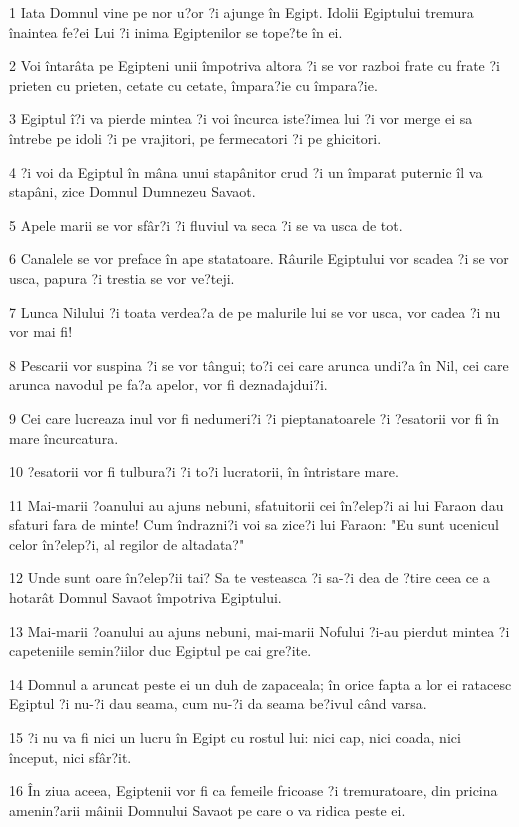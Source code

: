 \par 1 Iata Domnul vine pe nor u?or ?i ajunge în Egipt. Idolii Egiptului tremura înaintea fe?ei Lui ?i inima Egiptenilor se tope?te în ei.
\par 2 Voi întarâta pe Egipteni unii împotriva altora ?i se vor razboi frate cu frate ?i prieten cu prieten, cetate cu cetate, împara?ie cu împara?ie.
\par 3 Egiptul î?i va pierde mintea ?i voi încurca iste?imea lui ?i vor merge ei sa întrebe pe idoli ?i pe vrajitori, pe fermecatori ?i pe ghicitori.
\par 4 ?i voi da Egiptul în mâna unui stapânitor crud ?i un împarat puternic îl va stapâni, zice Domnul Dumnezeu Savaot.
\par 5 Apele marii se vor sfâr?i ?i fluviul va seca ?i se va usca de tot.
\par 6 Canalele se vor preface în ape statatoare. Râurile Egiptului vor scadea ?i se vor usca, papura ?i trestia se vor ve?teji.
\par 7 Lunca Nilului ?i toata verdea?a de pe malurile lui se vor usca, vor cadea ?i nu vor mai fi!
\par 8 Pescarii vor suspina ?i se vor tângui; to?i cei care arunca undi?a în Nil, cei care arunca navodul pe fa?a apelor, vor fi deznadajdui?i.
\par 9 Cei care lucreaza inul vor fi nedumeri?i ?i pieptanatoarele ?i ?esatorii vor fi în mare încurcatura.
\par 10 ?esatorii vor fi tulbura?i ?i to?i lucratorii, în întristare mare.
\par 11 Mai-marii ?oanului au ajuns nebuni, sfatuitorii cei în?elep?i ai lui Faraon dau sfaturi fara de minte! Cum îndrazni?i voi sa zice?i lui Faraon: "Eu sunt ucenicul celor în?elep?i, al regilor de altadata?"
\par 12 Unde sunt oare în?elep?ii tai? Sa te vesteasca ?i sa-?i dea de ?tire ceea ce a hotarât Domnul Savaot împotriva Egiptului.
\par 13 Mai-marii ?oanului au ajuns nebuni, mai-marii Nofului ?i-au pierdut mintea ?i capeteniile semin?iilor duc Egiptul pe cai gre?ite.
\par 14 Domnul a aruncat peste ei un duh de zapaceala; în orice fapta a lor ei ratacesc Egiptul ?i nu-?i dau seama, cum nu-?i da seama be?ivul când varsa.
\par 15 ?i nu va fi nici un lucru în Egipt cu rostul lui: nici cap, nici coada, nici început, nici sfâr?it.
\par 16 În ziua aceea, Egiptenii vor fi ca femeile fricoase ?i tremuratoare, din pricina amenin?arii mâinii Domnului Savaot pe care o va ridica peste ei.
